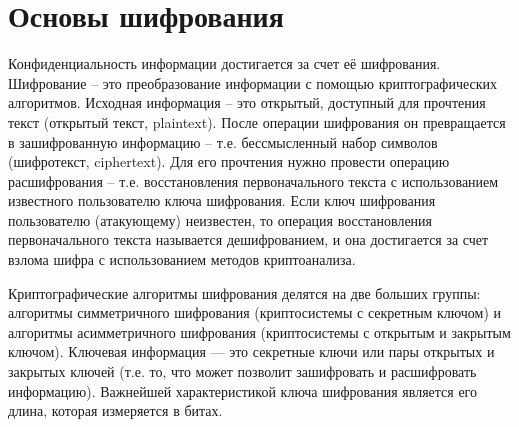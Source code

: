
\section*{Основы шифрования}

Конфиденциальность информации достигается за счет её шифрования. Шифрование
-- это преобразование информации с помощью криптографических алгоритмов.
Исходная информация -- это открытый, доступный для прочтения текст (открытый
текст, plaintext). После операции шифрования он превращается в зашифрованную
информацию -- т.е. бессмысленный набор символов (шифротекст, ciphertext). Для
его прочтения нужно провести операцию расшифрования -- т.е. восстановления
первоначального текста с использованием известного пользователю ключа
шифрования. Если ключ шифрования пользователю (атакующему) неизвестен, то
операция восстановления первоначального текста называется дешифрованием, и она
достигается за счет взлома шифра с использованием методов криптоанализа.

Криптографические алгоритмы шифрования делятся на две больших группы: алгоритмы
симметричного шифрования (криптосистемы с секретным ключом) и алгоритмы
асимметричного шифрования (криптосистемы с открытым и закрытым ключом).
Ключевая информация — это секретные ключи или пары открытых и закрытых ключей
(т.е. то, что может позволит зашифровать и расшифровать информацию). Важнейшей
характеристикой ключа шифрования является его длина, которая измеряется в
битах.

